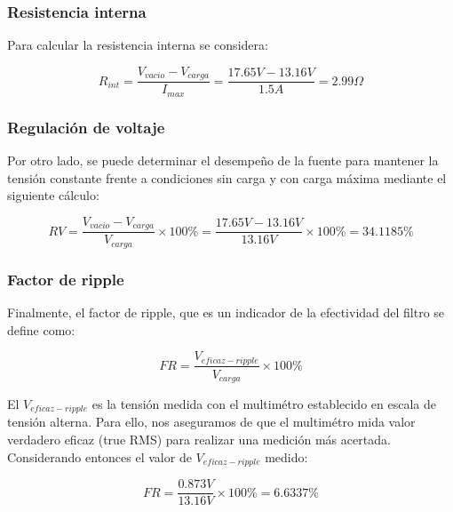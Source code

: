 \documentclass[chaptersright]{informeutn}
\begin{document}
        \subsubsection{Resistencia interna}

        Para calcular la resistencia interna se considera:

        \begin{equation*}
            R_{int} = \frac{V_{vacio} - V_{carga}}{I_{max}}= \frac{17.65V - 13.16V}{1.5A} = 2.99\Omega
        \end{equation*}

        \subsubsection{Regulación de voltaje}

        Por otro lado, se puede determinar el desempeño de la fuente para mantener la tensión constante frente a
        condiciones sin carga y con carga máxima mediante el siguiente cálculo:

        \begin{equation*}
            RV = \frac{V_{vacio} -V_{carga}}{V_{carga}} \times 100\% = \frac{17.65V-13.16V}{13.16V} \times 100\% = 34.1185\%
        \end{equation*}

        \subsubsection{Factor de ripple}

        Finalmente, el factor de ripple, que es un indicador de la efectividad del filtro se define como:

        \begin{equation*}
            FR = \frac{V_{eficaz-ripple}}{V_{carga}} \times 100\%
        \end{equation*}

        El $V_{eficaz-ripple}$ es la tensión medida con el multimétro establecido en escala de tensión alterna.
        Para ello, nos aseguramos de que el multimétro mida valor verdadero eficaz (true RMS) para realizar una
        medición más acertada. Considerando entonces el valor de $V_{eficaz-ripple}$ medido:

        \begin{equation*}
            FR = \frac{0.873V}{13.16V} \times 100\% = 6.6337\%
        \end{equation*}
\end{document}
